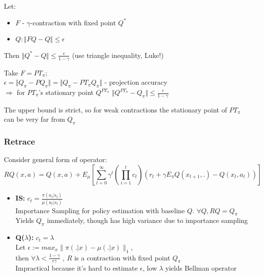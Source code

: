 \documentclass{beamer}
\begin{document}
\begin{frame}[t]
Let:
\begin{itemize}
\item $F$ - $\gamma$-contraction with fixed point $Q^*$\\
\item $Q: \Vert FQ - Q \Vert \leq \epsilon$
\end{itemize}
\vspace{3mm}
Then $\Vert Q^* - Q \Vert \leq \frac{\epsilon}{1-\gamma}$ (use triangle inequality, Luke!)

\vspace{4mm}

Take $F = PT_\pi$;\\
 $\epsilon = \Vert Q_\pi - PQ_\pi \Vert = \Vert Q_\pi - PT_\pi Q_\pi \Vert$ - projection accuracy\\
$\Rightarrow$ for $PT_\pi$'s stationary point $Q^{PT_\pi}$ $\Vert Q^{PT_\pi} - Q_\pi \Vert \leq \frac{\epsilon}{1-\gamma}$\\

\vspace{4mm}

The upper bound is strict, so for weak contractions the stationary point of $PT_\pi$ can be very far from $Q_\pi$

\end{frame}


\begin{frame}[t]
\frametitle{Retrace}

Consider general form of operator:
\begin{equation*}
R Q (x,a) = Q(x,a) + E_\mu \left[ \sum_{t=0}^\infty \gamma^t \left( \prod_{i=1}^{t} c_t \right) \left( r_t + \gamma E_\pi Q (x_{t+1},.) - Q(x_t,a_t) \right) \right]
\end{equation*}

\begin{itemize}
\item \textbf{IS:} $c_t = \frac{\pi(a_t | s_t) }{\mu(a_t | s_t)}$ \\
Importance Sampling for policy estimation with baseline $Q$. $\forall Q,  R Q = Q_\pi$\\
Yields $Q_\pi$ immediately, though has high variance due to importance sampling

\item \textbf{Q($\lambda$):} $c_t = \lambda$ \\
Let $\epsilon := max_x \parallel \pi(.|x) - \mu(.|x) \parallel _1$, \\
then $\forall \lambda < \frac{1-\gamma}{\epsilon \gamma}$ , $R$ is a contraction 
with fixed point $Q_\pi$\\
Impractical because it's hard to estimate $\epsilon$, low $\lambda$ yields Bellman operator


\end{itemize}
\end{frame}
\end{document}
